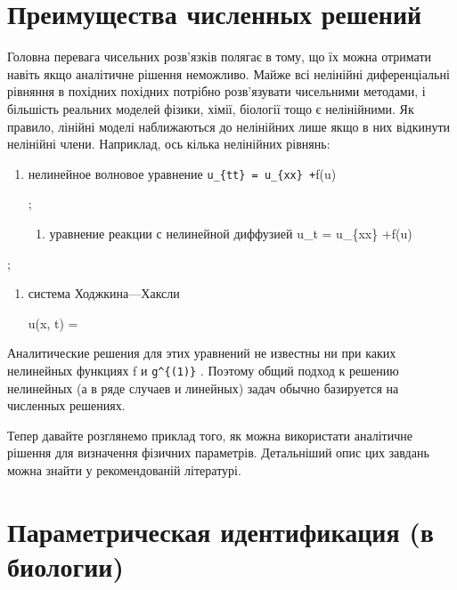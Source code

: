 \documentclass[
  ukrainian,
]{article}
\providecommand{\tightlist}{%
  \setlength{\itemsep}{0pt}\setlength{\parskip}{0pt}}
\begin{document}
\section{Преимущества численных
решений}\label{ux43fux440ux435ux438ux43cux443ux449ux435ux441ux442ux432ux430-ux447ux438ux441ux43bux435ux43dux43dux44bux445-ux440ux435ux448ux435ux43dux438ux439}

Головна перевага чисельних розв'язків полягає в тому, що їх можна
отримати навіть якщо аналітичне рішення неможливо. Майже всі нелінійні
диференціальні рівняння в похідних похідних потрібно розв'язувати
чисельними методами, і більшість реальних моделей фізики, хімії,
біології тощо є нелінійними. Як правило, лінійні моделі наближаються до
нелінійних лише якщо в них відкинути нелінійні члени. Наприклад, ось
кілька нелінійних рівнянь:

\begin{enumerate}
\def\labelenumi{\arabic{enumi})}
\item
  нелинейное волновое уравнение \texttt{u\_\{tt\}\ =\ u\_\{xx\}\ +}f(u)

  ;

  \begin{enumerate}
  \def\labelenumii{\arabic{enumii})}
  \setcounter{enumii}{1}
  \tightlist
  \item
    уравнение реакции с нелинейной диффузией u\_t = u\_\{xx\} +f(u)
  \end{enumerate}
\end{enumerate}

;

\begin{enumerate}
\def\labelenumi{\arabic{enumi})}
\setcounter{enumi}{2}
\item
  система Ходжкина---Хаксли

  u(x, t) =
\end{enumerate}

Аналитические решения для этих уравнений не известны ни при каких
нелинейных функциях f и \texttt{g\^{}\{(1)\}} . Поэтому общий подход к
решению нелинейных (а в ряде случаев и линейных) задач обычно базируется
на численных решениях.

Тепер давайте розглянемо приклад того, як можна використати аналітичне
рішення для визначення фізичних параметрів. Детальніший опис цих завдань
можна знайти у рекомендованій літературі.

\section{Параметрическая идентификация (в
биологии)}\label{ux43fux430ux440ux430ux43cux435ux442ux440ux438ux447ux435ux441ux43aux430ux44f-ux438ux434ux435ux43dux442ux438ux444ux438ux43aux430ux446ux438ux44f-ux432-ux431ux438ux43eux43bux43eux433ux438ux438}
\end{document}
